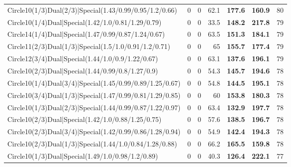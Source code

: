 \begin{tabular}{lrrrllr}
 Circle10(1/3)Dual(2/3)|Special(1.43/0.99/0.95/1.2/0.66)        &          0   &            0   &          62.1 & \textbf{177.6} & \textbf{160.9} &           80 \\
 Circle10(1/4)Dual|Special(1.42/1.0/0.81/1.29/0.79)             &          0   &            0   &          33.5 & \textbf{148.2} & \textbf{217.8} &           79 \\
 Circle14(1/4)Dual|Special(1.47/0.99/0.87/1.24/0.67)            &          0   &            0   &          63.5 & \textbf{151.3} & \textbf{184.1} &           79 \\
 Circle11(2/3)Dual(1/3)|Special(1.5/1.0/0.91/1.2/0.71)          &          0   &            0   &          65   & \textbf{155.7} & \textbf{177.4} &           79 \\
 Circle12(3/4)Dual|Special(1.44/1.0/0.9/1.22/0.67)              &          0   &            0   &          63.1 & \textbf{137.6} & \textbf{196.1} &           79 \\
 Circle10(2/3)Dual|Special(1.44/0.99/0.8/1.27/0.9)              &          0   &            0   &          54.3 & \textbf{145.7} & \textbf{194.6} &           78 \\
 Circle10(1/4)Dual(3/4)|Special(1.45/0.99/0.89/1.25/0.67)       &          0   &            0   &          54.8 & \textbf{144.5} & \textbf{195.1} &           78 \\
 Circle10(3/4)Dual(1/3)|Special(1.47/0.99/0.81/1.29/0.85)       &          0   &            0   &          60   & \textbf{153.8} & \textbf{180.3} &           78 \\
 Circle10(1/3)Dual(2/3)|Special(1.44/0.99/0.87/1.22/0.97)       &          0   &            0   &          63.4 & \textbf{132.9} & \textbf{197.7} &           78 \\
 Circle10(2/3)Dual|Special(1.42/1.0/0.88/1.25/0.75)             &          0   &            0   &          57.6 & \textbf{138.5} & \textbf{196.7} &           78 \\
 Circle10(2/3)Dual(3/4)|Special(1.42/0.99/0.86/1.28/0.94)       &          0   &            0   &          54.9 & \textbf{142.4} & \textbf{194.3} &           78 \\
 Circle10(2/3)Dual(1/3)|Special(1.44/1.0/0.84/1.28/0.88)        &          0   &            0   &          66.2 & \textbf{165.5} & \textbf{159.8} &           78 \\
 Circle10(1/3)Dual|Special(1.49/1.0/0.98/1.2/0.89)              &          0   &            0   &          40.3 & \textbf{126.4} & \textbf{222.1} &           77 \\

\end{tabular}
